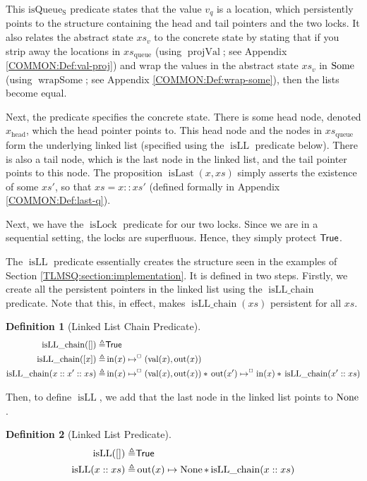 \documentclass[a4paper, 10pt]{report}
\theoremstyle{definition}
\newtheorem{definition}{Definition}[section]
\newcommand{\isLock}{\operatorname{isLock}}
\newcommand{\isqueueseq}{\operatorname{isQueue_{S}}}
\newcommand{\vq}{v_q}
\newcommand{\xsc}{xs}
\newcommand{\xsqueue}{xs_{\mathrm{queue}}}
\newcommand{\isLLchain}{\operatorname{isLL\_chain}}
\newcommand{\isLL}{\operatorname{isLL}}
\newcommand{\projval}{\operatorname{projVal}}
\newcommand{\wrapsome}{\operatorname{wrapSome}}
\newcommand{\isLast}{\operatorname{isLast}}
\newcommand{\nIn}[1]{\operatorname{in}(#1)}
\newcommand{\nVal}[1]{\operatorname{val}(#1)}
\newcommand{\nOut}[1]{\operatorname{out}(#1)}
\newcommand{\node}{x}
\newcommand{\nodeN}[1]{\node_{\mathrm{#1}}}
\newcommand{\nodehead}{\nodeN{head}}
\newcommand{\absvalueList}{xs_v}
\newcommand{\isNode}[1]{\nIn{#1} \mapsto^{\persistently} (\nVal{#1}, \nOut{#1})}
\begin{document}
This $\isqueueseq$ predicate states that the value $\vq$ is a location, which persistently points to the structure containing the head and tail pointers and the two locks. It also relates the abstract state $\absvalueList$ to the concrete state by stating that if you strip away the locations in $\xsqueue$ (using $\projval$; see Appendix \ref{COMMON:Def:val-proj}) and wrap the values in the abstract state $\absvalueList$ in $\operatorname{Some}$ (using $\wrapsome$; see Appendix \ref{COMMON:Def:wrap-some}), then the lists become equal.

Next, the predicate specifies the concrete state. There is some head node, denoted $\nodehead$, which the head pointer points to. This head node and the nodes in $\xsqueue$ form the underlying linked list (specified using the $\isLL$ predicate below). There is also a tail node, which is the last node in the linked list, and the tail pointer points to this node. The proposition $\isLast(\node, \xsc)$ simply asserts the existence of some $\xsc'$, so that $\xsc = \node :: \xsc'$ (defined formally in Appendix \ref{COMMON:Def:last-q}).

Next, we have the $\isLock$ predicate for our two locks. Since we are in a sequential setting, the locks are superfluous. Hence, they simply protect $\textsf{True}$.

The $\isLL$ predicate essentially creates the structure seen in the examples of Section \ref{TLMSQ:section:implementation}. It is defined in two steps. Firstly, we create all the persistent pointers in the linked list using the $\isLLchain$ predicate. Note that this, in effect, makes $\isLLchain(\xsc)$ persistent for all $\xsc$.
\begin{definition}[Linked List Chain Predicate]
  \begin{align*}
    \isLLchain([]) \eqdef& \TRUE\\
    \isLLchain([\node]) \eqdef& \isNode{\node}\\
    \isLLchain(\node :: \node' :: \xsc) \eqdef& \isNode{\node} \star{} \nOut{\node'} \mapsto^{\persistently} \nIn{\node} \star{} \isLLchain(\node' :: \xsc)
  \end{align*}
\end{definition}

Then, to define $\isLL$, we add that the last node in the linked list points to $\operatorname{None}$.
\begin{definition}[Linked List Predicate]
  \begin{align*}
    \isLL([]) \eqdef& \TRUE\\
    \isLL(\node :: \xsc) \eqdef& \nOut{\node} \mapsto \None \star{} \isLLchain(\node :: \xsc)
  \end{align*}
\end{definition}
\end{document}
